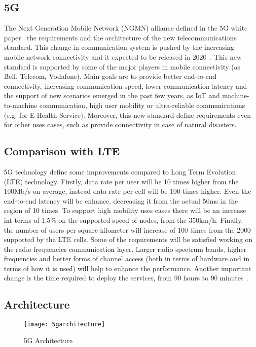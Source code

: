 \subsection{5G}
The Next Generation Mobile Network (NGMN) alliance defined in the 5G
white paper~\cite{alliance20155g} the
requirements and the architecture of the new telecommunications standard. 
This change in communication system is pushed by the increasing mobile network
connectivity and it expected to be released in 2020~\cite{iwamura2015ngmn}. This
new standard is supported by some of the major players in mobile connectivity 
(as Bell, Telecom, Vodafone). Main goals are to provide better end-to-end
connectivity, increasing communication speed, lower communication latency and
the support of new scenarios emerged in the past few years, as IoT and
machine-to-machine communication, high user mobility or ultra-reliable
communications (e.g. for E-Health Service). Moreover, this new standard define
requirements even for other uses cases, such as provide connectivity in case of
natural disasters. 

\subsection{Comparison with LTE}
5G technology define some improvements compared to Long Term Evolution (LTE)
technology. Firstly, data rate per user will be 10 times higher from the 100Mb/s
on average, instead data rate per cell will be 100 times higher. Even the
end-to-end latency will be enhance, decreasing it from the actual 50ms in the
region of 10 times. To support high mobility uses cases there will be an
increase int terms of 1.5\% on the supported speed of nodes, from the 350km/h.
Finally, the number of users per square kilometer will increase of 100 times
from the 2000 supported by the LTE cells. Some of the requirements will be
satisfied working on the radio frequencies communication layer. Larger radio
spectrum bands, higher frequencies and better forms of channel access (both in
terms of hardware and in terms of how it is used) will help to enhance the
performance. Another important change is the time required to deploy the
services,
from 90 hours to 90 minutes~\cite{networld20202014role}.

\subsection{Architecture}
\begin{figure}[t]
  \centering
  \texttt{[image: 5garchitecture]}
  \caption[5G Architecture]{5G Architecture~\cite{alliance20155g}}
  \label{chap:background:img:5garchitecture}
\end{figure}

